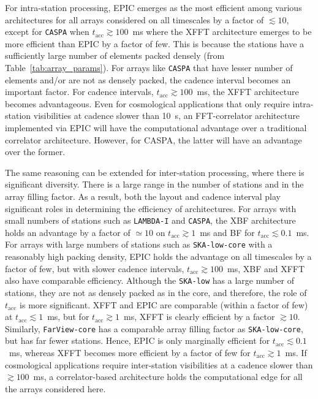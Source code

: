 \documentclass[
  journal=pasa,
  manuscript=article-type,
  year=2020,
  volume=37,
]{cup-journal}
\begin{document}
For intra-station processing, EPIC emerges as the most efficient among various architectures for all arrays considered on all timescales by a factor of $\lesssim 10$, except for \texttt{CASPA} when $t_\textrm{acc}\gtrsim 100$~ms where the XFFT architecture emerges to be more efficient than EPIC by a factor of few. This is because the stations have a sufficiently large number of elements packed densely (from Table~\ref{tab:array_params}). For arrays like \texttt{CASPA} that have lesser number of elements and/or are not as densely packed, the cadence interval becomes an important factor. For cadence intervals, $t_\textrm{acc}\gtrsim 100$~ms, the XFFT architecture becomes advantageous. Even for cosmological applications that only require intra-station visibilities at cadence slower than 10~s, an FFT-correlator architecture implemented via EPIC will have the computational advantage over a traditional correlator architecture. However, for CASPA, the latter will have an advantage over the former.

The same reasoning can be extended for inter-station processing, where there is significant diversity. There is a large range in the number of stations and in the array filling factor. As a result, both the layout and cadence interval play significant roles in determining the efficiency of architectures. For arrays with small numbers of stations such as \texttt{LAMBDA-I} and \texttt{CASPA}, the XBF architecture holds an advantage by a factor of $\simeq 10$ on $t_\textrm{acc}\gtrsim 1$~ms and BF for $t_\textrm{acc}\lesssim 0.1$~ms. For arrays with large numbers of stations such as \texttt{SKA-low-core} with a reasonably high packing density, EPIC holds the advantage on all timescales by a factor of few, but with slower cadence intervals, $t_\textrm{acc}\gtrsim 100$~ms, XBF and XFFT also have comparable efficiency. Although the \texttt{SKA-low} has a large number of stations, they are not as densely packed as in the core, and therefore, the role of $t_\textrm{acc}$ is more significant. XFFT and EPIC are comparable (within a factor of few) at $t_\textrm{acc}\lesssim 1$~ms, but for $t_\textrm{acc}\gtrsim 1$~ms, XFFT is clearly efficient by a factor $\gtrsim 10$. Similarly, \texttt{FarView-core} has a comparable array filling factor as \texttt{SKA-low-core}, but has far fewer stations. Hence, EPIC is only marginally efficient for $t_\textrm{acc}\lesssim 0.1$~ms, whereas XFFT becomes more efficient by a factor of few for $t_\textrm{acc}\gtrsim 1$~ms. If cosmological applications require inter-station visibilities at a cadence slower than $\gtrsim 100$~ms, a correlator-based architecture holds the computational edge for all the arrays considered here.
\end{document}
